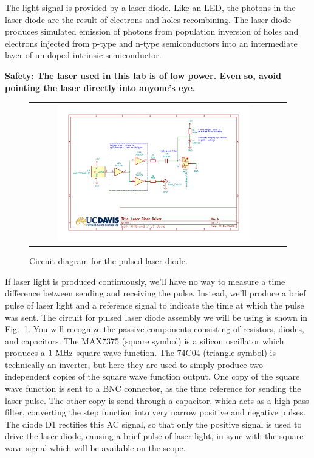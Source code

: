 The light signal is provided by a laser diode.  Like an
LED, the photons in the laser diode are the result of electrons and
holes recombining.  The laser diode produces simulated emission of
photons from population inversion of holes and electrons injected from
p-type and n-type semiconductors into an intermediate layer of
un-doped intrinsic semiconductor.  

\textbf{Safety: The laser used in this lab is of low power.  Even so, avoid pointing the laser directly into anyone's eye.}



\begin{figure}[htbp]
\begin{center}
\begin{tabular}{cc}
\includegraphics[width=0.8\textwidth]{figs/labs/c_air/cair_diodedriver}
\end{tabular}
\end{center}
\caption{\label{fig:clasercirc} Circuit diagram for the pulsed laser diode.}
\end{figure}

If laser light is produced continuously, we'll have no way to measure
a time difference between sending and receiving the pulse.  Instead,
we'll produce a brief pulse of laser light and a reference signal to
indicate the time at which the pulse was sent.  The circuit for pulsed
laser diode assembly we will be using is shown in
Fig.~\ref{fig:clasercirc}.  You will recognize the passive components
consisting of resistors, diodes, and capacitors.  The MAX7375 (square
symbol) is a silicon oscillator which produces a $1~\rm MHz$ square
wave function.  The 74C04 (triangle symbol) is technically an
inverter, but here they are used to simply produce two independent
copies of the square wave function output.  One copy of the square
wave function is sent to a BNC connector, as the time reference for
sending the laser pulse.  The other copy is send through a capacitor,
which acts as a high-pass filter, converting the step function into
very narrow positive and negative pulses.  The diode D1 rectifies this
AC signal, so that only the positive signal is used to drive the laser
diode, causing a brief pulse of laser light, in sync with the square
wave signal which will be available on the scope.

